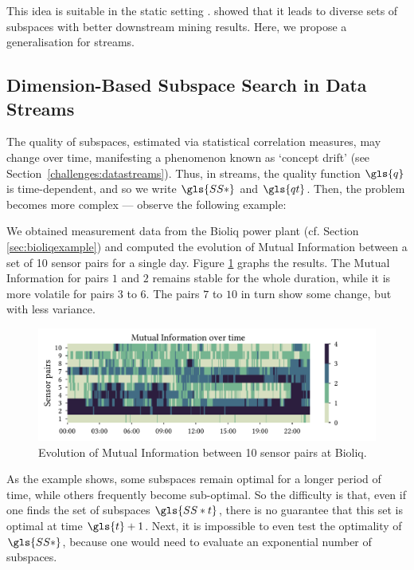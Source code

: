 This idea is suitable in the static setting \cite{DBLP:conf/icde/KellerMB12, DBLP:conf/aaai/WangRNBMX17}. \cite{DBLP:journals/ijdsa/TrittenbachB19} showed that it leads to diverse sets of subspaces with better downstream mining results. 
Here, we propose a generalisation for streams. 

\subsection{Dimension-Based Subspace Search in Data Streams}
\label{sec:adaptation-stream}

The quality of subspaces, estimated via statistical correlation measures, may change over time, manifesting a phenomenon known as `concept drift' \cite{DBLP:conf/ictai/BarddalGE15} (see Section~\ref{challenges:datastreams}). Thus, in streams, the quality function $\gls{q}$ is time-dependent, and so we write  $\gls{SS*}$ and $\gls{qt}$. Then, the problem becomes more complex --- observe the following example:

\begin{example}
	\label{example:mutual_information}
	We obtained measurement data from the Bioliq power plant (cf. Section \ref{sec:bioliqexample}) and computed the evolution  of Mutual Information between a set of 10 sensor pairs for a single day. Figure \ref{fig:MI_evolution} graphs the results. The Mutual Information for pairs $1$ and $2$ remains stable for the whole duration, while it is more volatile for pairs $3$ to $6$. The pairs $7$ to $10$ in turn show some change, but with less variance. 
\end{example}

\begin{figure}
	\centering
	\includegraphics[width=0.9\linewidth, trim=0 0 2cm 0]{part4-figures/evolution_mutual_information_thesis-compressed.pdf}
	\caption{Evolution of Mutual Information between 10 sensor pairs at \acrshort{Bioliq}.} 
	\label{fig:MI_evolution}
\end{figure} 

As the example shows, some subspaces remain optimal for a longer period of time, while others frequently become sub-optimal. 
So the difficulty is that, even if one finds the set of subspaces $\gls{SS*t}$, there is no guarantee that this set is optimal at time $\gls{t}+1$. Next, it is impossible to even test the optimality of $\gls{SS*}$, because one would need to evaluate an exponential number of subspaces.


